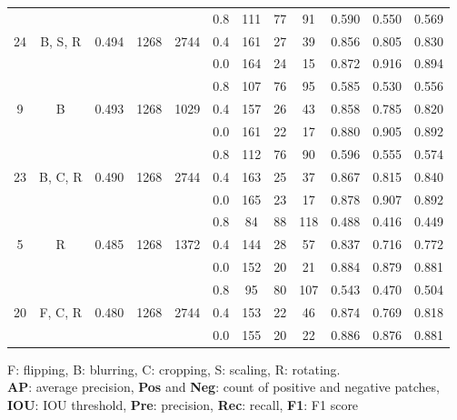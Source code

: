 \documentclass[preprint,12pt,authoryear]{elsarticle}
\begin{document}
\begin{table}
\begin{tabular}{c c c c  c ccc c c c c}
\multirow{3}{*}{24} &  \multirow{3}{*}{B, S, R} & \multirow{3}{*}{0.494 } & \multirow{3}{*}{1268} & \multirow{3}{*}{2744} &0.8 & 111 & 77 & 91 & 0.590  & 0.550  & 0.569 \\
 &  & &  &   & 0.4 & 161 & 27 & 39 & 0.856  & 0.805  & 0.830 \\
 &  & &  &   & 0.0 & 164 & 24 & 15 & 0.872  & 0.916  & 0.894 \\
\midrule
\multirow{3}{*}{9} &  \multirow{3}{*}{B} & \multirow{3}{*}{0.493 } & \multirow{3}{*}{1268} & \multirow{3}{*}{1029} &0.8 & 107 & 76 & 95 & 0.585  & 0.530  & 0.556 \\
 &  & &  &   & 0.4 & 157 & 26 & 43 & 0.858  & 0.785  & 0.820 \\
 &  & &  &   & 0.0 & 161 & 22 & 17 & 0.880  & 0.905  & 0.892 \\
\midrule
\multirow{3}{*}{23} &  \multirow{3}{*}{B, C, R} & \multirow{3}{*}{0.490 } & \multirow{3}{*}{1268} & \multirow{3}{*}{2744} &0.8 & 112 & 76 & 90 & 0.596  & 0.555  & 0.574 \\
 &  & &  &   & 0.4 & 163 & 25 & 37 & 0.867  & 0.815  & 0.840 \\
 &  & &  &   & 0.0 & 165 & 23 & 17 & 0.878  & 0.907  & 0.892 \\
\midrule
\multirow{3}{*}{5} &  \multirow{3}{*}{R} & \multirow{3}{*}{0.485 } & \multirow{3}{*}{1268} & \multirow{3}{*}{1372} &0.8 & 84 & 88 & 118 & 0.488  & 0.416  & 0.449 \\
 &  & &  &   & 0.4 & 144 & 28 & 57 & 0.837  & 0.716  & 0.772 \\
 &  & &  &   & 0.0 & 152 & 20 & 21 & 0.884  & 0.879  & 0.881 \\
\midrule
\multirow{3}{*}{20} &  \multirow{3}{*}{F, C, R} & \multirow{3}{*}{0.480 } & \multirow{3}{*}{1268} & \multirow{3}{*}{2744} &0.8 & 95 & 80 & 107 & 0.543  & 0.470  & 0.504 \\
 &  & &  &   & 0.4 & 153 & 22 & 46 & 0.874  & 0.769  & 0.818 \\
 &  & &  &   & 0.0 & 155 & 20 & 22 & 0.886  & 0.876  & 0.881 \\

\bottomrule
\end{tabular}
\raggedright F: flipping, B: blurring, C: cropping, S: scaling, R: rotating.  \\\textbf{AP}: average precision, \textbf{Pos} and \textbf{Neg}: count of positive and negative patches, \textbf{IOU}: IOU threshold, \textbf{Pre}: precision, \textbf{Rec}: recall, \textbf{F1}: F1 score

\end{table}
\end{document}
